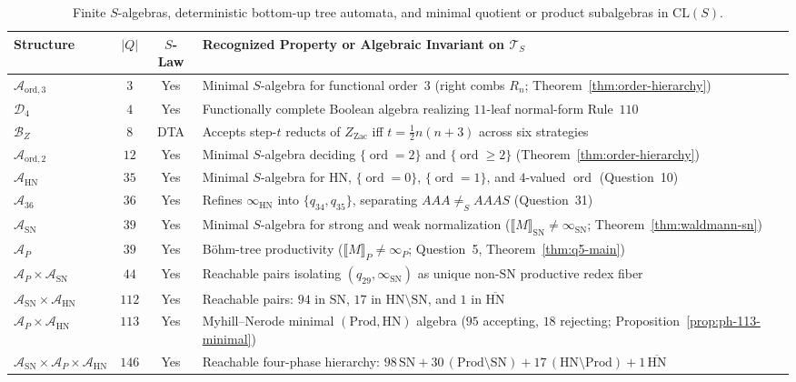 \documentclass[11pt,reqno]{amsart}
\numberwithin{equation}{section}
\theoremstyle{plain}
\theoremstyle{definition}
\theoremstyle{remark}
\DeclareMathOperator{\ord}{ord}
\newcommand{\CLS}{\mathrm{CL}(S)}
\newcommand{\TS}{\mathcal{T}_S}
\newcommand{\SN}{\mathrm{SN}}
\newcommand{\HN}{\mathrm{HN}}
\newcommand{\Prod}{\mathrm{Prod}}
\newcommand{\sem}[1]{\llbracket #1 \rrbracket}
\begin{document}
\begin{table}[htbp]
\centering
\caption{Finite $S$-algebras, deterministic bottom-up tree automata, and minimal quotient or product subalgebras in $\CLS$.}
\label{tab:algebra-tower}
\small
\begin{tabular}{@{}lccl@{}}
\toprule
Structure & $|Q|$ & $S$-Law & Recognized Property or Algebraic Invariant on $\TS$ \\
\midrule
$\mathcal{A}_{\mathrm{ord},3}$ & $3$ & Yes & Minimal $S$-algebra for functional order~$3$ (right combs $R_n$; Theorem~\ref{thm:order-hierarchy}) \\
$\mathcal{D}_4$ & $4$ & Yes & Functionally complete Boolean algebra realizing $11$-leaf normal-form Rule~$110$ \\
$\mathcal{B}_Z$ & $8$ & DTA & Accepts step-$t$ reducts of $Z_{\mathrm{Zac}}$ iff $t = \tfrac{1}{2}n(n+3)$ across six strategies \\
$\mathcal{A}_{\mathrm{ord},2}$ & $12$ & Yes & Minimal $S$-algebra deciding $\{\ord = 2\}$ and $\{\ord \ge 2\}$ (Theorem~\ref{thm:order-hierarchy}) \\
$\mathcal{A}_{\HN}$ & $35$ & Yes & Minimal $S$-algebra for $\HN$, $\{\ord = 0\}$, $\{\ord = 1\}$, and $4$-valued $\ord$ (Question~10) \\
$\mathcal{A}_{36}$ & $36$ & Yes & Refines $\infty_{\HN}$ into $\{q_{34}, q_{35}\}$, separating $A A A \neq_S A A A S$ (Question~31) \\
$\mathcal{A}_{\SN}$ & $39$ & Yes & Minimal $S$-algebra for strong and weak normalization ($\sem{M}_{\SN} \neq \infty_{\SN}$; Theorem~\ref{thm:waldmann-sn}) \\
$\mathcal{A}_P$ & $39$ & Yes & B\"ohm-tree productivity ($\sem{M}_P \neq \infty_P$; Question~5, Theorem~\ref{thm:q5-main}) \\
$\mathcal{A}_P \times \mathcal{A}_{\SN}$ & $44$ & Yes & Reachable pairs isolating $(q_{29}, \infty_{\SN})$ as unique non-$\SN$ productive redex fiber \\
$\mathcal{A}_{\SN} \times \mathcal{A}_{\HN}$ & $112$ & Yes & Reachable pairs: $94$ in $\SN$, $17$ in $\HN \setminus \SN$, and $1$ in $\overline{\HN}$ \\
$\mathcal{A}_P \times \mathcal{A}_{\HN}$ & $113$ & Yes & Myhill--Nerode minimal $(\Prod, \HN)$ algebra ($95$ accepting, $18$ rejecting; Proposition~\ref{prop:ph-113-minimal}) \\
$\mathcal{A}_{\SN} \times \mathcal{A}_P \times \mathcal{A}_{\HN}$ & $146$ & Yes & Reachable four-phase hierarchy: $98\,\SN + 30\,(\Prod\setminus\SN) + 17\,(\HN\setminus\Prod) + 1\,\overline{\HN}$ \\
\bottomrule
\end{tabular}
\end{table}
\end{document}
